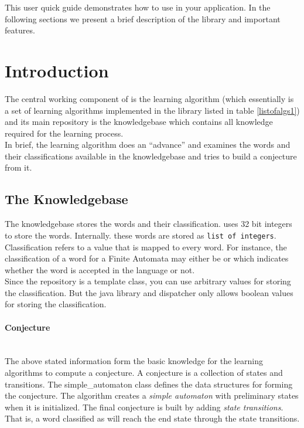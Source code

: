 
This user quick guide demonstrates how to use \libalf in your application. In the following sections we present a brief description of the library and important features.

\section{Introduction}
The central working component of \libalf is the learning algorithm (which essentially is a set of learning algorithms implemented in the library listed in table \ref{listofalgs1}) and its main repository is the knowledgebase which contains all knowledge required for the learning process. \\
In brief, the learning algorithm does an ``advance'' and examines the words and their classifications available in the knowledgebase and tries to build a conjecture from it. \\

\subsection{The Knowledgebase}
The knowledgebase stores the words and their classification. \libalf uses 32 bit integers to store the words. Internally. these words are stored as \texttt{list of integers}. \\
Classification refers to a value that is mapped to every word. For instance, the classification of a word for a Finite Automata may either be \true or \false which indicates whether the word is accepted in the language or not. \\
Since the repository is a template class, you can use arbitrary values for storing the classification. But the \jalf java library and dispatcher only allows boolean values for storing the classification. 
\paragraph{Conjecture} \\
The above stated information form the basic knowledge for the learning algorithms to compute a conjecture. A conjecture is a collection of states and transitions. The simple\_automaton class defines the data structures for forming the conjecture. The algorithm creates a \emph{simple automaton} with preliminary states when it is initialized. The final conjecture is built by adding \emph{state transitions}. That is, a word classified as \true will reach the end state through the state transitions. 


